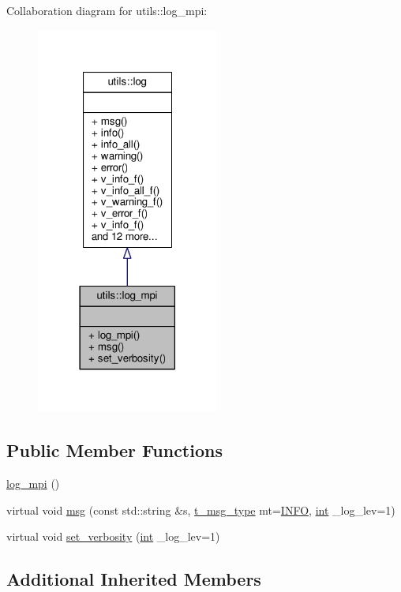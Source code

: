 Collaboration diagram for utils\-:\-:log\-\_\-mpi\-:\nopagebreak
\begin{figure}[H]
\begin{center}
\leavevmode
\includegraphics[width=170pt]{classutils_1_1log__mpi__coll__graph}
\end{center}
\end{figure}
\subsection*{Public Member Functions}
\begin{DoxyCompactItemize}
\item 
\hyperlink{classutils_1_1log__mpi_ac8e1c08fee2cff9e537e19e4a7d81cbc}{log\-\_\-mpi} ()
\item 
virtual void \hyperlink{classutils_1_1log__mpi_a28c8d59f3d1a9082e774915c0885a4e2}{msg} (const std\-::string \&s, \hyperlink{classutils_1_1log_a295e2ee43d4e5ade12dd5de546cb1983}{t\-\_\-msg\-\_\-type} mt=\hyperlink{classutils_1_1log_a295e2ee43d4e5ade12dd5de546cb1983a34a1a7830fae0bde90731e751a1ed9c0}{I\-N\-F\-O}, \hyperlink{classint}{int} \-\_\-log\-\_\-lev=1)
\item 
virtual void \hyperlink{classutils_1_1log__mpi_aa0577a73c96f3b9f2b64ce4387e0d749}{set\-\_\-verbosity} (\hyperlink{classint}{int} \-\_\-log\-\_\-lev=1)
\end{DoxyCompactItemize}
\subsection*{Additional Inherited Members}


